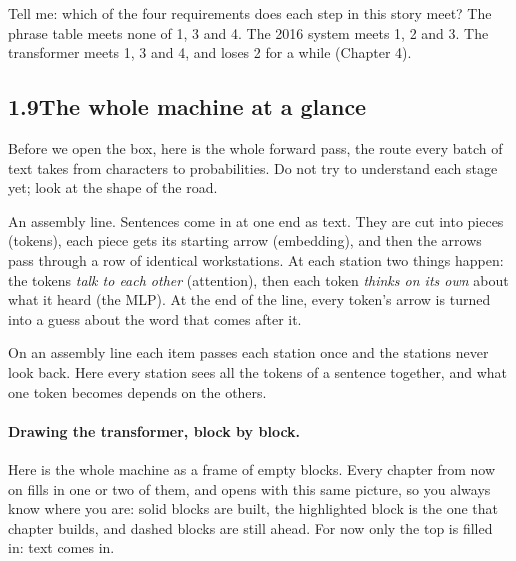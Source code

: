 Tell me: which of the four requirements does each step in this story meet? The phrase table meets none of 1, 3
and 4. The 2016 system meets 1, 2 and 3. The transformer meets 1, 3 and 4, and loses 2 for a while (Chapter 4).


\subsection*{1.9\quad The whole machine at a glance}

Before we open the box, here is the whole forward pass, the route every batch of text takes from characters to
probabilities. Do not try to understand each stage yet; look at the shape of the road.

\Picture An assembly line. Sentences come in at one end as text. They are cut into pieces (tokens), each piece
gets its starting arrow (embedding), and then the arrows pass through a row of identical workstations. At each
station two things happen: the tokens \emph{talk to each other} (attention), then each token \emph{thinks on its
own} about what it heard (the MLP). At the end of the line, every token's arrow is turned into a guess about the
word that comes after it.

\begin{breaks}
On an assembly line each item passes each station once and the stations never look back. Here every station
sees all the tokens of a sentence together, and what one token becomes depends on the others.
\end{breaks}

\paragraph{Drawing the transformer, block by block.} Here is the whole machine as a frame of empty blocks.
Every chapter from now on fills in one or two of them, and opens with this same picture, so you always know
where you are: solid blocks are built, the highlighted block is the one that chapter builds, and dashed blocks
are still ahead. For now only the top is filled in: text comes in.


